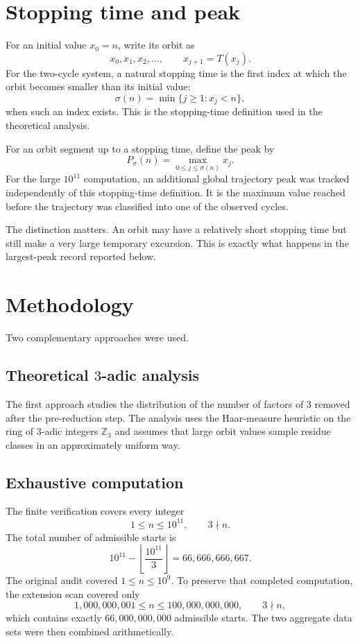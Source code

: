 \documentclass[11pt]{article}
\begin{document}
\section{Stopping time and peak}
For an initial value $x_0=n$, write its orbit as
\[
x_0,x_1,x_2,\ldots,
\qquad x_{j+1}=T(x_j).
\]
For the two-cycle system, a natural stopping time is the first index at which the orbit becomes smaller than its initial value:
\[
\sigma(n)=\min\{j\ge1:x_j<n\},
\tag{3}
\]
when such an index exists. This is the stopping-time definition used in the theoretical analysis.

For an orbit segment up to a stopping time, define the peak by
\[
P_\sigma(n)=\max_{0\le j\le\sigma(n)}x_j.
\tag{4}
\]
For the large $10^{11}$ computation, an additional global trajectory peak was tracked independently of this stopping-time definition. It is the maximum value reached before the trajectory was classified into one of the observed cycles.

The distinction matters. An orbit may have a relatively short stopping time but still make a very large temporary excursion. This is exactly what happens in the largest-peak record reported below.

\section{Methodology}
Two complementary approaches were used.

\subsection{Theoretical $3$-adic analysis}
The first approach studies the distribution of the number of factors of $3$ removed after the pre-reduction step. The analysis uses the Haar-measure heuristic on the ring of $3$-adic integers $\mathbb Z_3$ and assumes that large orbit values sample residue classes in an approximately uniform way.

\subsection{Exhaustive computation}
The finite verification covers every integer
\[
1\le n\le10^{11},\qquad 3\nmid n.
\]
The total number of admissible starts is
\[
10^{11}-\left\lfloor\frac{10^{11}}{3}\right\rfloor
=66,666,666,667.
\]
The original audit covered $1\le n\le10^9$. To preserve that completed computation, the extension scan covered only
\[
1,000,000,001\le n\le100,000,000,000,
\qquad 3\nmid n,
\]
which contains exactly $66,000,000,000$ admissible starts. The two aggregate data sets were then combined arithmetically.
\end{document}
